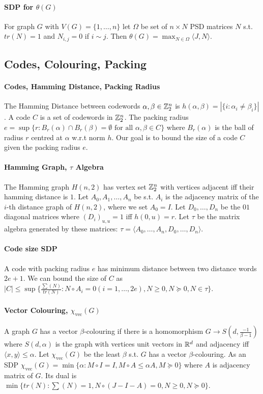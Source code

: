 \documentclass[letterpaper,11pt,oneside,onecolumn]{article}
\begin{document}
\paragraph{SDP for $\theta(G)$} For graph $G$ with $V(G) = \{1,\dots,n\}$ let $\Omega$ be set of $n\times N$ PSD matrices $N$ s.t. $tr(N) = 1$ and $N_{i,j} = 0$ if $i\sim j$. Then $\theta(G) = \max_{N \in \Omega} \langle J, N\rangle$.
\subsection*{Codes, Colouring, Packing}
\paragraph{Codes, Hamming Distance, Packing Radius} The Hamming Distance between codewords $\alpha,\beta \in \mathbb{Z}^n_2$ is $h(\alpha,\beta) = |\{i:\alpha_i \neq \beta_i \}|$. A code $C$ is a set of codewords in $\mathbb{Z}^n_2$. The packing radius $e = \sup \{ r: B_r(\alpha) \cap B_r(\beta) = \emptyset \text{ for all } \alpha,\beta \in C\}$ where $B_r(\alpha)$ is the ball of radius $r$ centred at $\alpha$ w.r.t norm $h$. Our goal is to bound the size of a code $C$ given the packing radius $e$.
\paragraph{Hamming Graph, $\tau$ Algebra} The Hamming graph $H(n,2)$ has vertex set $\mathbb{Z}^n_2$ with vertices adjacent iff their hamming distance is $1$. Let $A_0, A_1, \dots, A_n$ be s.t. $A_i$ is the adjacency matrix of the $i$-th distance graph of $H(n,2)$, where we set $A_0 = I$. Let $D_0,\dots, D_n$ be the $0$$1$ diagonal matrices where $(D_i)_{u,u}= 1$ iff $h(0,u) = r$. Let $\tau$ be the matrix algebra generated by these matrices: $\tau = \langle A_0, \dots, A_n, D_0, \dots, D_n \rangle$.
\paragraph{Code size SDP} A code with packing radius $e$ has minimum distance between two distance words $2e+1$. We can bound the size of $C$ as $|C| \leq \sup \{ \frac{\sum(N)}{tr(N)} : N \circ A_i = 0 (i = 1, \dots, 2e), N \geq 0, N \succcurlyeq 0, N \in \tau \}$.
\paragraph{Vector Colouring, $\chi_{\text{vec}}(G)$} A graph $G$ has a vector $\beta$-colouring if there is a homomorphism $G \rightarrow S(d, \frac{-1}{\beta -1})$ where $S(d,\alpha)$ is the graph with vertices unit vectors in $\mathbb{R}^d$ and adjacency iff $\langle x, y\rangle \leq \alpha$. Let $\chi_{\text{vec}}(G)$ be the least $\beta$ s.t. $G$ has a vector $\beta$-colouring. As an SDP $\chi_{\text{vec}}(G) = \min\{\alpha: M\circ I = I, M\circ A\leq \alpha A, M \succcurlyeq 0\}$ where $A$ is adjacency matrix of $G$. Its dual is $\min\{tr(N) : \sum(N) = 1, N\circ(J-I-A) = 0, N \geq 0, N \succcurlyeq 0\}$.
\end{document}
